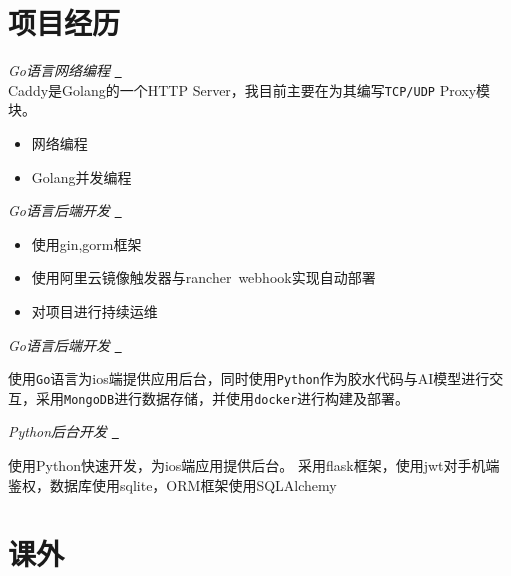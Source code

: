 \documentclass{uniquecv}
\begin{document}


\section{项目经历}

\textit{Go语言网络编程}
\quad \href{https://github.com/caddyserver/caddy}{{\color{gray}{\faLink}}~}
\vspace{0.4ex}
\\
Caddy是Golang的一个HTTP Server，我目前主要在为其编写\texttt{TCP/UDP} Proxy模块。
\begin{itemize}
    \item 网络编程
    \item Golang并发编程
\end{itemize}

\textit{Go语言后端开发}
\quad \href{https://github.com/colinaaa/UniqueHackDayDashboard-backend}{{\color{gray}{\faLink}}~}
\vspace{0.4ex}

\begin{itemize}
  \item 使用gin,gorm框架
  \item 使用阿里云镜像触发器与rancher\ webhook实现自动部署
  \item 对项目进行持续运维
\end{itemize}

\textit{Go语言后端开发}
\quad \href{https://github.com/colinaaa/hackweek}{{\color{gray}{\faLink}}~}
\vspace{0.4ex}

使用\texttt{Go}语言为ios端提供应用后台，同时使用\texttt{Python}作为胶水代码与AI模型进行交互，采用\texttt{MongoDB}进行数据存储，并使用\texttt{docker}进行构建及部署。

\textit{Python后台开发}
\quad \href{https://github.com/colinaaa/tasks_uniquestudio}{{\color{gray}{\faLink}}~}

使用Python快速开发，为ios端应用提供后台。
\vspace{0.4ex}
采用flask框架，使用jwt对手机端鉴权，数据库使用sqlite，ORM框架使用SQLAlchemy

\section{课外}
\end{document}
